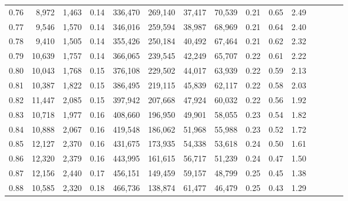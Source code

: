\begin{tabular}{rrrcrrrrrrrrrrr}
0.76 &   8,972 &   1,463 &                                       0.14 &  336,470 &  269,140 &   37,417 &   70,539 &  0.21 &  0.65 &                         2.49 \\
0.77 &   9,546 &   1,570 &                                       0.14 &  346,016 &  259,594 &   38,987 &   68,969 &  0.21 &  0.64 &                         2.40 \\
0.78 &   9,410 &   1,505 &                                       0.14 &  355,426 &  250,184 &   40,492 &   67,464 &  0.21 &  0.62 &                         2.32 \\
0.79 &  10,639 &   1,757 &                                       0.14 &  366,065 &  239,545 &   42,249 &   65,707 &  0.22 &  0.61 &                         2.22 \\
0.80 &  10,043 &   1,768 &                                       0.15 &  376,108 &  229,502 &   44,017 &   63,939 &  0.22 &  0.59 &                         2.13 \\
0.81 &  10,387 &   1,822 &                                       0.15 &  386,495 &  219,115 &   45,839 &   62,117 &  0.22 &  0.58 &                         2.03 \\
0.82 &  11,447 &   2,085 &                                       0.15 &  397,942 &  207,668 &   47,924 &   60,032 &  0.22 &  0.56 &                         1.92 \\
0.83 &  10,718 &   1,977 &                                       0.16 &  408,660 &  196,950 &   49,901 &   58,055 &  0.23 &  0.54 &                         1.82 \\
0.84 &  10,888 &   2,067 &                                       0.16 &  419,548 &  186,062 &   51,968 &   55,988 &  0.23 &  0.52 &                         1.72 \\
0.85 &  12,127 &   2,370 &                                       0.16 &  431,675 &  173,935 &   54,338 &   53,618 &  0.24 &  0.50 &                         1.61 \\
0.86 &  12,320 &   2,379 &                                       0.16 &  443,995 &  161,615 &   56,717 &   51,239 &  0.24 &  0.47 &                         1.50 \\
0.87 &  12,156 &   2,440 &                                       0.17 &  456,151 &  149,459 &   59,157 &   48,799 &  0.25 &  0.45 &                         1.38 \\
0.88 &  10,585 &   2,320 &                                       0.18 &  466,736 &  138,874 &   61,477 &   46,479 &  0.25 &  0.43 &                         1.29 \\

\end{tabular}
